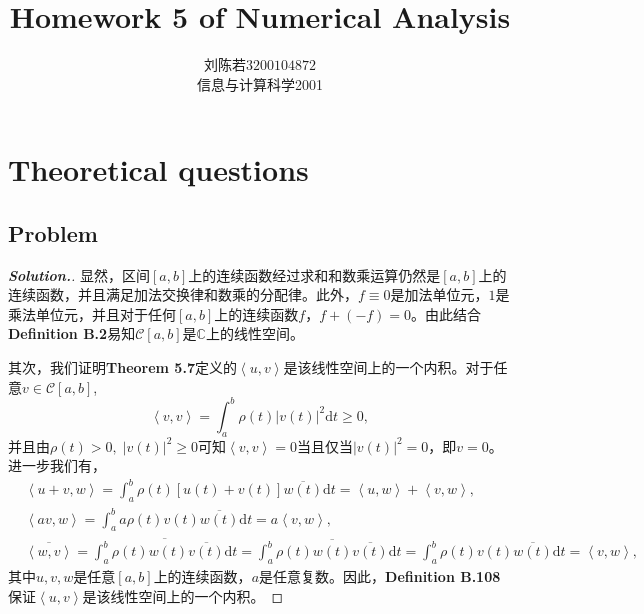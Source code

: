 \documentclass{ctexart}
\begin{document}
\begin{sloppypar}
\title{\vspace{-3cm} \textbf{Homework 5 of Numerical Analysis}}
\author{刘陈若\;$3200104872$\\信息与计算科学2001}
\date{}

\maketitle

\section*{Theoretical questions}
\subsection*{Problem \uppercase\expandafter{}}
\begin{proof}[\textbf{Solution.}]
显然，区间$[a,b]$上的连续函数经过求和和数乘运算仍然是$[a,b]$上的连续函数，并且满足加法交换律和数乘的分配律。此外，$f \equiv 0$是加法单位元，$1$是乘法单位元，并且对于任何$[a,b]$上的连续函数$f$，$f+(-f)=0$。由此结合\textbf{Definition B.2}易知$\mathcal{C}[a,b]$是$\mathbb{C}$上的线性空间。

其次，我们证明\textbf{Theorem 5.7}定义的$\left \langle u,v \right \rangle$是该线性空间上的一个内积。对于任意$v \in \mathcal{C}[a,b]$,
\begin{equation}
  \left \langle v,v \right \rangle = \int_a^b \rho (t)|v(t)|^2 \mathrm{d}t \geq 0,
\end{equation}
并且由$\rho(t) > 0, \; |v(t)|^2 \geq 0 $可知$\left \langle v,v \right \rangle = 0$当且仅当$|v(t)|^2 = 0$，即$v = 0$。进一步我们有，
\begin{equation}
    \begin{split}
        &\left \langle u+v,w \right \rangle = \int_a^b \rho(t)[u(t) + v(t)]\overline{w(t)}  \mathrm{d}t = \left \langle u,w \right \rangle + \left \langle v,w \right \rangle, \\
        &\left \langle av,w \right \rangle = \int_a^b a\rho(t)v(t)\overline{w(t)} \mathrm{d}t = a\left \langle v,w \right \rangle, \\
        &\overline{\left \langle w,v \right \rangle} = \overline{\int_a^b \rho(t)w(t)\overline{v(t)} \mathrm{d}t} = \int_a^b \overline{\rho(t)w(t)\overline{v(t)}} \mathrm{d}t = \int_a^b \rho(t)v(t)\overline{w(t)} \mathrm{d}t = \left \langle v,w \right \rangle,
    \end{split}
\end{equation}
其中$u,v,w$是任意$[a,b]$上的连续函数，$a$是任意复数。因此，\textbf{Definition B.108}保证$\left \langle u,v \right \rangle$是该线性空间上的一个内积。


\end{proof}
\end{sloppypar}
\end{document}
